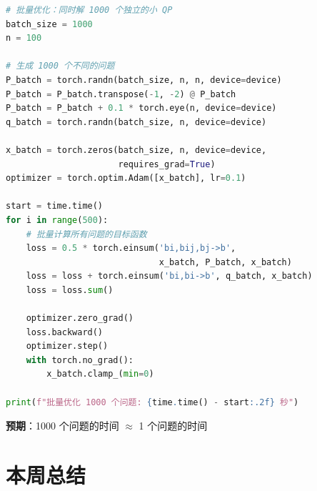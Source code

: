 \documentclass[12pt, a4paper]{ctexart}
\begin{document}
\begin{blackboard}

\begin{lstlisting}[language=Python]
# 批量优化：同时解 1000 个独立的小 QP
batch_size = 1000
n = 100

# 生成 1000 个不同的问题
P_batch = torch.randn(batch_size, n, n, device=device)
P_batch = P_batch.transpose(-1, -2) @ P_batch 
P_batch = P_batch + 0.1 * torch.eye(n, device=device)
q_batch = torch.randn(batch_size, n, device=device)

x_batch = torch.zeros(batch_size, n, device=device, 
                      requires_grad=True)
optimizer = torch.optim.Adam([x_batch], lr=0.1)

start = time.time()
for i in range(500):
    # 批量计算所有问题的目标函数
    loss = 0.5 * torch.einsum('bi,bij,bj->b', 
                              x_batch, P_batch, x_batch)
    loss = loss + torch.einsum('bi,bi->b', q_batch, x_batch)
    loss = loss.sum()
    
    optimizer.zero_grad()
    loss.backward()
    optimizer.step()
    with torch.no_grad():
        x_batch.clamp_(min=0)

print(f"批量优化 1000 个问题: {time.time() - start:.2f} 秒")
\end{lstlisting}

\textbf{预期}：1000 个问题的时间 $\approx$ 1 个问题的时间

\end{blackboard}

\section{本周总结}
\end{document}
